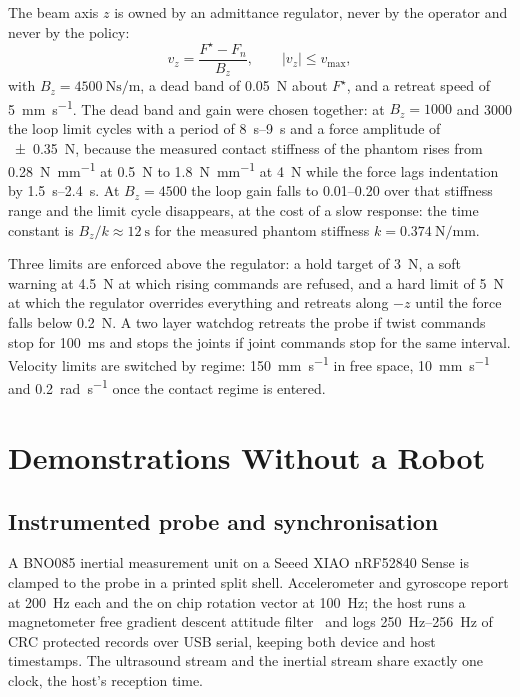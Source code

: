 \documentclass[conference]{IEEEtran}
\begin{document}
The beam axis $z$ is owned by an admittance regulator, never by the operator and
never by the policy:
\begin{equation}
v_z = \frac{F^\star - F_n}{B_z},\qquad |v_z| \le v_{\max},
\end{equation}
with $B_z = \SI{4500}{\newton\second\per\metre}$, a dead band of
\SI{0.05}{\newton} about $F^\star$, and a retreat speed of
\SI{5}{\milli\metre\per\second}. The dead band and gain were chosen together:
at $B_z = \num{1000}$ and \num{3000} the loop limit cycles with a period of
\SIrange{8}{9}{\second} and a force amplitude of \SI{\pm 0.35}{\newton}, because
the measured contact stiffness of the phantom rises from
\SI{0.28}{\newton\per\milli\metre} at \SI{0.5}{\newton} to
\SI{1.8}{\newton\per\milli\metre} at \SI{4}{\newton} while the force lags
indentation by \SIrange{1.5}{2.4}{\second}. At $B_z = \num{4500}$ the loop gain
falls to \numrange{0.01}{0.20} over that stiffness range and the limit cycle
disappears, at the cost of a slow response: the time constant is
$B_z/k \approx \SI{12}{\second}$ for the measured phantom stiffness
$k = \SI{0.374}{\newton\per\milli\metre}$.

Three limits are enforced above the regulator: a hold target of
\SI{3}{\newton}, a soft warning at \SI{4.5}{\newton} at which rising commands
are refused, and a hard limit of \SI{5}{\newton} at which the regulator
overrides everything and retreats along $-z$ until the force falls below
\SI{0.2}{\newton}. A two layer watchdog retreats the probe if twist commands
stop for \SI{100}{\milli\second} and stops the joints if joint commands stop for
the same interval. Velocity limits are switched by regime:
\SI{150}{\milli\metre\per\second} in free space,
\SI{10}{\milli\metre\per\second} and \SI{0.2}{\radian\per\second} once the
contact regime is entered.

\section{Demonstrations Without a Robot}
\label{sec:data}

\subsection{Instrumented probe and synchronisation}

A BNO085 inertial measurement unit on a Seeed XIAO nRF52840 Sense is clamped to
the probe in a printed split shell. Accelerometer and gyroscope report at
\SI{200}{\hertz} each and the on chip rotation vector at \SI{100}{\hertz}; the
host runs a magnetometer free gradient descent attitude
filter~\cite{madgwick2011estimation} and logs \SIrange{250}{256}{\hertz} of CRC
protected records over USB serial,
keeping both device and host timestamps. The ultrasound stream and the inertial
stream share exactly one clock, the host's reception time.
\end{document}
